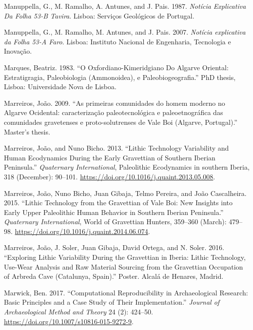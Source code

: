 \documentclass[
  a4paper,
  DIV=11,
  numbers=noendperiod]{scrreprt}
\newlength{\cslhangindent}
\newenvironment{CSLReferences}[2] %
 {\begin{list}{}{%
  \setlength{\itemindent}{0pt}
  \setlength{\leftmargin}{0pt}
  \setlength{\parsep}{0pt}
  \ifodd #1
   \setlength{\leftmargin}{\cslhangindent}
   \setlength{\itemindent}{-1\cslhangindent}
  \fi
  \setlength{\itemsep}{#2\baselineskip}}}
 {\end{list}}
\begin{document}
\begin{CSLReferences}{1}{0}
Manuppella, G., M. Ramalho, A. Antunes, and J. Pais. 1987.
\emph{Not{í}cia Explicativa Da Folha 53-{B Tavira}}. Lisboa: Servi{ç}os
Geol{ó}gicos de Portugal.

Manuppella, G., M. Ramalho, M. Antunes, and J. Pais. 2007.
\emph{{Not{í}cia explicativa da Folha 53-A Faro}}. Lisboa: Instituto
Nacional de Engenharia, Tecnologia e Inova{ç}{ã}o.

Marques, Beatriz. 1983. {``O {Oxfordiano-Kimeridgiano} Do {Algarve}
Oriental: Estratigragia, Paleobiologia ({Ammonoidea}), e
Paleobiogeografia.''} PhD thesis, Lisboa: Universidade Nova de Lisboa.

Marreiros, João. 2009. {``{As primeiras comunidades do homem moderno no
Algarve Ocidental: caracteriza{ç}{ã}o paleotecnol{ó}gica e
paleoetnogr{á}fica das comunidades gravetenses e proto-solutrenses de
Vale Boi (Algarve, Portugal)}.''} Master's thesis.

Marreiros, João, and Nuno Bicho. 2013. {``Lithic Technology Variability
and Human Ecodynamics During the {Early Gravettian} of {Southern Iberian
Peninsula}.''} \emph{Quaternary International}, Paleolithic
{Ecodynamics} in southern {Iberia}, 318 (December): 90--101.
\url{https://doi.org/10.1016/j.quaint.2013.05.008}.

Marreiros, João, Nuno Bicho, Juan Gibaja, Telmo Pereira, and João
Cascalheira. 2015. {``Lithic Technology from the {Gravettian} of {Vale
Boi}: New Insights into {Early Upper Paleolithic} Human Behavior in
{Southern Iberian Peninsula}.''} \emph{Quaternary International}, World
of {Gravettian Hunters}, 359--360 (March): 479--98.
\url{https://doi.org/10.1016/j.quaint.2014.06.074}.

Marreiros, João, J. Soler, Juan Gibaja, David Ortega, and N. Soler.
2016. {``Exploring Lithic Variability During the {Gravettian} in
{Iberia}: {Lithic} Technology, Use-Wear Analysis and Raw Material
Sourcing from the {Gravettian} Occupation of {Arbreda Cave}
({Catalunya}, {Spain}).''} Poster. Alcal{á} de Henares, Madrid.

Marwick, Ben. 2017. {``Computational {Reproducibility} in
{Archaeological Research}: {Basic Principles} and a {Case Study} of
{Their Implementation}.''} \emph{Journal of Archaeological Method and
Theory} 24 (2): 424--50.
\url{https://doi.org/10.1007/s10816-015-9272-9}.


\end{CSLReferences}
\end{document}
